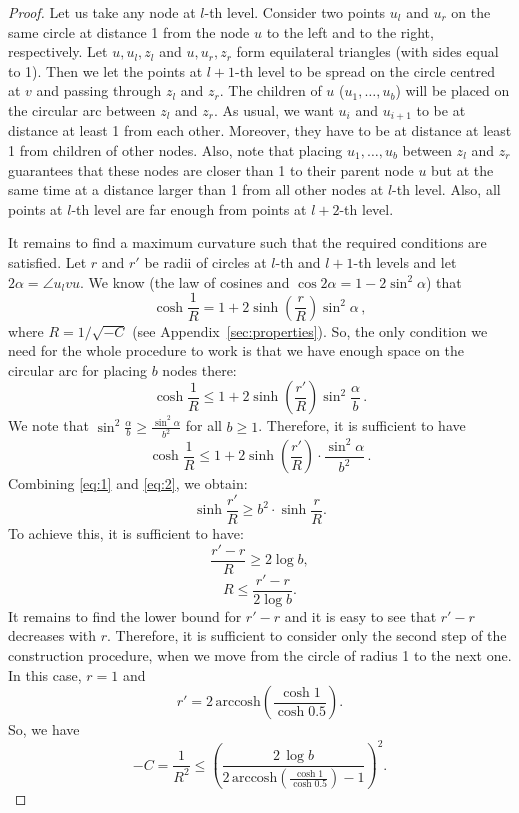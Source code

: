 \documentclass[runningheads]{llncs}
\begin{document}
\begin{proof}
Let us take any node at $l$-th level. Consider two points $u_l$ and $u_r$ on the same circle at distance 1 from the node $u$ to the left and to the right, respectively.
Let $u,u_l,z_l$ and $u,u_r,z_r$ form equilateral triangles (with sides equal to 1). Then we let the points at $l+1$-th level to be spread on the circle centred at $v$ and passing through $z_l$ and $z_r$. The children of $u$ ($u_1, \ldots, u_{b}$) will be placed on the circular arc between $z_l$ and $z_r$. As usual, we want $u_i$ and $u_{i+1}$ to be at distance at least 1 from each other. Moreover, they have to be at distance at least 1 from children of other nodes. Also, note that placing $u_1, \ldots, u_{b}$ between $z_l$ and $z_r$ guarantees that these nodes are closer than 1 to their parent node $u$ but at the same time at a distance larger than 1 from all other nodes at $l$-th level. Also, all points at $l$-th level are far enough from points at $l+2$-th level. 

It remains to find a maximum curvature such that the required conditions are satisfied. Let $r$ and $r'$ be radii of circles at $l$-th and $l+1$-th levels and let $2\alpha = \angle u_l v u$. We know (the law of cosines and $\cos 2\alpha = 1 - 2\sin^2 \alpha$) that
\begin{equation}\label{eq:1}
\cosh \frac{1}{R} = 1 + 2 \sinh \left( \frac{r}{R} \right) \sin^2 \alpha \,,
\end{equation}
where $R = 1/\sqrt{-C}$ (see Appendix~\ref{sec:properties}).
So, the only condition we need for the whole procedure to work is that we have enough space on the circular arc for placing $b$ nodes there:
\[
\cosh \frac{1}{R} \le 1 + 2 \sinh \left( \frac{r'}{R} \right) \sin^2 \frac{\alpha}{b} \,.
\]
We note that $\sin^2 \frac{\alpha}{b} \ge \frac{\sin^2 \alpha}{b^2}$ for all $b \ge 1$. Therefore, it is sufficient to have
\begin{equation}\label{eq:2}
\cosh \frac{1}{R} \le 1 + 2 \sinh \left(\frac{r'}{R}\right) \cdot \frac{\sin^2 \alpha}{b^2} \,.
\end{equation}
Combining \eqref{eq:1} and \eqref{eq:2}, we obtain:
\[
\sinh \frac{r'}{R} \ge b^2 \cdot \sinh \frac{r}{R}.
\]
To achieve this, it is sufficient to have: 
\[
\frac{r' - r}{R} \ge 2 \log b,
\]
\[
R \le \frac{r' - r}{2 \log b}.
\]
It remains to find the lower bound for $r' - r$ and it is easy to see that $r' - r$ decreases with $r$. Therefore, it is sufficient to consider only the second step of the construction procedure, when we move from the circle of radius 1 to the next one. In this case, $r = 1$ and 
\[
r' = 2 \, \mathrm{arccosh} \left( \frac{\cosh1}{\cosh 0.5} \right).
\]
So, we have 
\[
-C = \frac{1}{R^2} \le \left( \frac{2\,\log b}{2 \, \mathrm{arccosh}\left( \frac{\cosh 1}{\cosh 0.5} \right) - 1} \right)^2.
\]
\end{proof}
\end{document}

